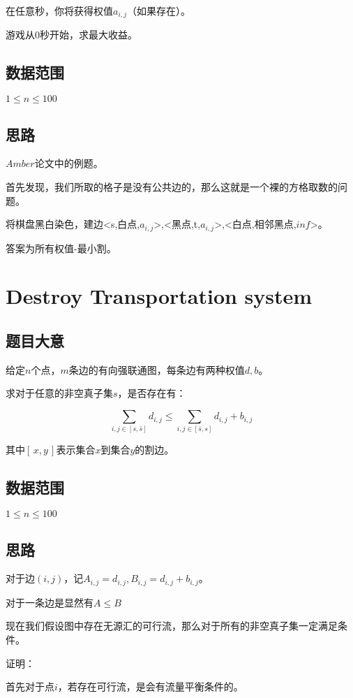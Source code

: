 \documentclass{ctexart}
\numberwithin{equation}{section}
\begin{document}
\begin{flushleft}
  在任意秒，你将获得权值$a_{i,j}$（如果存在）。

  游戏从$0$秒开始，求最大收益。
  
  \subsection{数据范围}
  $1\le n \le 100$
  
  \subsection{思路}
  $Amber$论文中的例题。

  首先发现，我们所取的格子是没有公共边的，那么这就是一个裸的方格取数的问题。

  将棋盘黑白染色，建边<s,白点,$a_{i,j}$>,<黑点,t,$a_{i,j}$>,<白点,相邻黑点,$inf$>。

  答案为所有权值-最小割。

  \newpage

  \section{Destroy Transportation system}
  \subsection{题目大意}
  给定$n$个点，$m$条边的有向强联通图，每条边有两种权值$d,b$。

  求对于任意的非空真子集$s$，是否存在有：

  $$\sum_{i,j\in [s, \bar{s}]} d_{i,j} \le \sum_{i,j\in [\bar{s},s]} d_{i,j}+b_{i,j}$$

  其中$[\,x,y\,]$表示集合$x$到集合$y$的割边。
  \subsection{数据范围}
  $1\le n \le 100$
  
  \subsection{思路}
  对于边$(i,j)$，记$A_{i,j}=d_{i,j},B_{i,j}=d_{i,j}+b_{i,j}$。

  对于一条边是显然有$A \le B$

  现在我们假设图中存在无源汇的可行流，那么对于所有的非空真子集一定满足条件。

  证明：

  首先对于点$i$，若存在可行流，是会有流量平衡条件的。


\end{flushleft}
\end{document}
